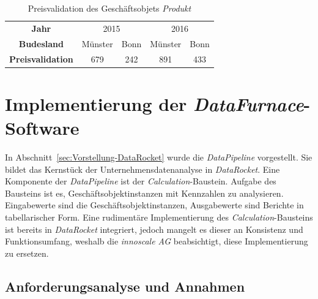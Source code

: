 \documentclass[
  language=german, %
  type=bachelor,%
  ngerman
]{isthesis}
\begin{document}
\begin{content}
  \begin{table}
    \footnotesize
    \begin{tabular}{c c c c c}
      \textbf{Jahr} & \multicolumn{2}{c}{2015} & \multicolumn{2}{c}{2016} \\
      \cmidrule(lr){2-3}\cmidrule(lr){4-5}
      \textbf{Budesland} & Münster & Bonn & Münster & Bonn \\
      \toprule
      \textbf{Preisvalidation} & 679 & 242 & 891 & 433 \\
    \end{tabular}
    \caption{Preisvalidation des Geschäftsobjets \textit{Produkt}}\label{table:preisvalidation}
  \end{table}


  \chapter{Implementierung der \textit{DataFurnace}-Software}\label{ch:implementierung-datafurnace}

  In Abschnitt~\ref{sec:Vorstellung-DataRocket} wurde die \textit{DataPipeline}
  vorgestellt. Sie bildet das Kernstück der Unternehmensdatenanalyse in
  \textit{DataRocket}. Eine Komponente der \textit{DataPipeline} ist der
  \textit{Calculation}-Baustein.  Aufgabe des Bausteins ist es,
  Geschäftsobjektinstanzen mit Kennzahlen zu analysieren. Eingabewerte sind die
  Geschäftsobjektinstanzen, Ausgabewerte sind Berichte in tabellarischer Form.
  Eine rudimentäre Implementierung des \textit{Calculation}-Bausteins ist
  bereits in \textit{DataRocket} integriert, jedoch mangelt es dieser an
  Konsistenz und Funktionsumfang, weshalb die \textit{innoscale AG}
  beabsichtigt, diese Implementierung zu ersetzen.

  \section{Anforderungsanalyse und Annahmen}\label{sec:software/anforderungsanalyse}


\end{content}
\end{document}
